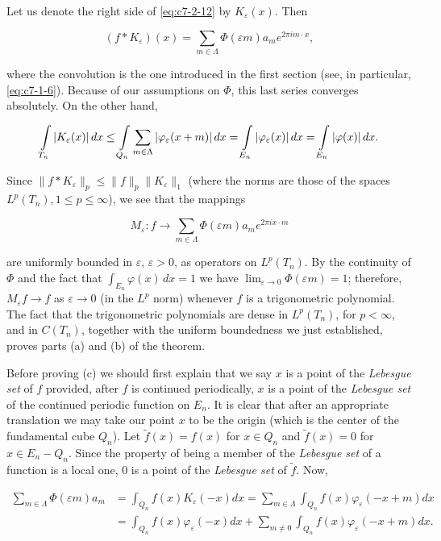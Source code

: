 Let us denote the right side of \eqref{eq:c7-2-12} by $K_{\varepsilon}(x)$. Then

\[
(f* K_{\varepsilon})(x)=\sum_{m\in\Lambda}\Phi(\varepsilon m)a_{m}e^{2\pi i m\cdot x},
\]

where the convolution is the one introduced in the first section (see, in particular, \eqref{eq:c7-1-6}). Because of our assumptions on $\Phi$, this last series converges absolutely. On the other hand,

\[
\intop_{T_{n}}\left|K_{\varepsilon}(x)\right|d x\leq\intop_{Q_{n}}\sum_{m\in\Lambda}\left|\varphi_{\varepsilon}(x+m)\right|d x=\intop_{E_{n}}\left|\varphi_{\varepsilon}(x)\right|d x=\intop_{E_{n}}\left|\varphi(x)\right|d x.
\]

Since $\|f*K_\varepsilon\|_p \leq \|f\|_p\|K_\varepsilon\|_1$ (where the norms are those of the spaces $L^p(T_n), 1 \leq p \leq \infty$), we see that the mappings

\[
M_{\varepsilon}\colon f\to\sum_{m\in\Lambda}\Phi(\varepsilon m)a_{m}e^{2\pi i x\cdot m}
\]

are uniformly bounded in $\varepsilon$, $\varepsilon > 0$, as operators on $L^p(T_n)$. By the continuity of $\Phi$ and the fact that $\int_{E_n} \varphi(x) \, dx = 1$ we have $\lim_{\varepsilon \to 0} \Phi(\varepsilon m) = 1$; therefore, $M_\varepsilon f \to f$ as $\varepsilon \to 0$ (in the $L^p$ norm) whenever $f$ is a trigonometric polynomial. The fact that the trigonometric polynomials are dense in $L^p(T_n)$, for $p < \infty$, and in $C(T_n)$, together with the uniform boundedness we just established, proves parts (a) and (b) of the theorem.

Before proving (c) we should first explain that we say $x$ is a point of the \textit{Lebesgue set} of $f$ provided, after $f$ is continued periodically, $x$ is a point of the \textit{Lebesgue set} of the continued periodic function on $E_n$. It is clear that after an appropriate translation we may take our point $x$ to be the origin (which is the center of the fundamental cube $Q_n$). Let $\tilde{f}(x) = f(x)$ for $x \in Q_n$ and $\tilde{f}(x) = 0$ for $x \in E_n - Q_n$. Since the property of being a member of the \textit{Lebesgue set} of a function is a local one, $0$ is a point of the \textit{Lebesgue set} of $\tilde{f}$. Now,

\[
\begin{aligned}\sum_{m\in\Lambda}\Phi(\varepsilon m)a_{m}&=\int_{Q_{n}}f(x)K_\varepsilon(-x)dx=\sum_{m\in\Lambda}\int_{Q_{n}}f(x)\varphi_\varepsilon(-x+m)dx\\&=\int_{Q_{n}}f(x)\varphi_\varepsilon(-x)dx+\sum_{m\neq0}\int_{Q_{n}}f(x)\varphi_\varepsilon(-x+m)dx.\end{aligned}
\]

